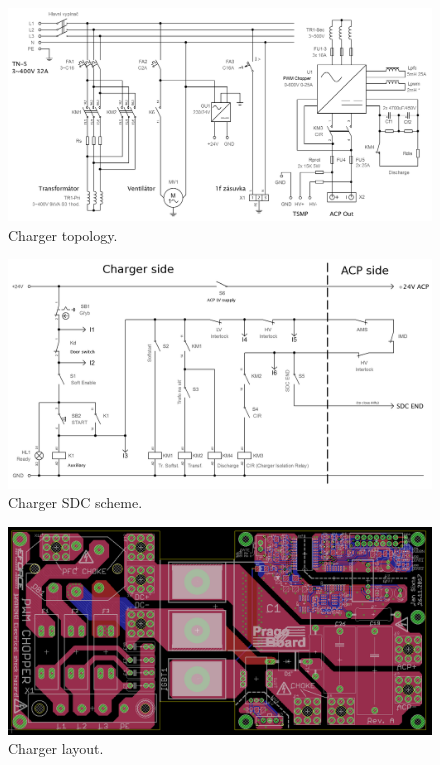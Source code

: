 \begin{figure}[H]
	\centering
	\includegraphics[width=\textwidth]{./img/charger_topology.png}
	\caption{Charger topology.}
	\label{fig:charger_topology}
\end{figure}

\begin{figure}[H]
	\centering
	\includegraphics[width=\textwidth]{./img/charger_sdc_schematic.png}
	\caption{Charger SDC scheme.}
	\label{fig:charger_sdc_scheme}
\end{figure}

\begin{figure}[H]
	\centering
	\includegraphics[width=\textwidth]{./img/charger_layout.png}
	\caption{Charger layout.}
	\label{fig:charger_layout}
\end{figure}


